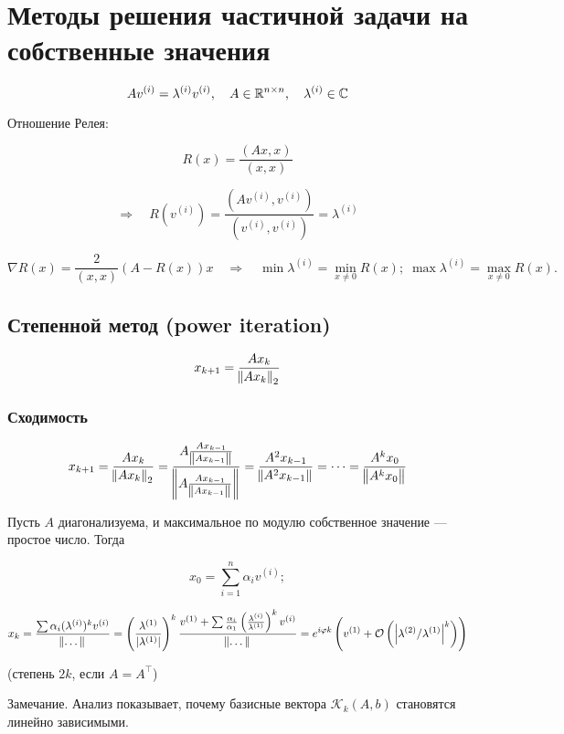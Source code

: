 \section{Методы решения частичной задачи на собственные значения}

\[
    A v^{(i)} = \lambda^{(i)} v^{(i)}, \quad A \in \mathbb{R}^{n \times n}, \quad
    \lambda^{(i)} \in \mathbb{C}
\]

Отношение Релея:

\[
    R(x) = \frac{(A x, x)}{(x, x)}
\]

\[
    \Rightarrow\quad R(v^{(i)})
    = \frac{(A v^{(i)}, v^{(i)})}{(v^{(i)}, v^{(i)})}
    = \lambda^{(i)}
\]

\[
    \nabla R(x) = \frac{2}{(x, x)} (A - R(x)) x \quad\Rightarrow\quad
    \min \lambda^{(i)} = \min_{x \ne 0} R(x); \;
    \max \lambda^{(i)} = \max_{x \ne 0} R(x).
\]

\subsection{Степенной метод (power iteration)}

\[
    x_{k + 1} = \frac{A x_k}{\norm{A x_k}_2}
\]

\subsubsection{Сходимость}

\[
    x_{k + 1} = \frac{A x_k}{\norm{A x_k}_2}
    = \frac{A \frac{A x_{k - 1}}{\norm{A x_{k - 1}}}}
     {\norm{A \frac{A x_{k - 1}}{\norm{A x_{k - 1}}}}}
    = \frac{A^2 x_{k - 1}}{\norm{A^2 x_{k - 1}}} = \dots
    = \frac{A^k x_0}{\norm{A^k x_0}}
\]

Пусть $A$ диагонализуема, и максимальное по модулю собственное значение ---
простое число. Тогда

\[
    x_0 = \sum_{i = 1}^n \alpha_i v^{(i)};
\]

\[
    x_k = \frac{\sum \alpha_i (\lambda^{(i)})^k v^{(i)}}{\norm{\dots}}
    = \left(\frac{\lambda^{(1)}}{|\lambda^{(1)}|}\right)^k
    \frac{v^{(1)} + \sum \frac{\alpha_i}{\alpha_1} \left(\frac{\lambda^{(i)}}
        {\lambda^{(1)}}\right)^k v^{(i)}}{\norm{\dots}}
    = e^{i \varphi k} \left( v^{(1)} + \mathcal{O} \left( \left| \lambda^{(2)}
            / \lambda^{(1)} \right|^k \right) \right)
\]

(степень $2k$, если $A = A^\top$)

Замечание. Анализ показывает, почему базисные вектора $\mathcal{K}_k(A, b)$
становятся линейно зависимыми.

